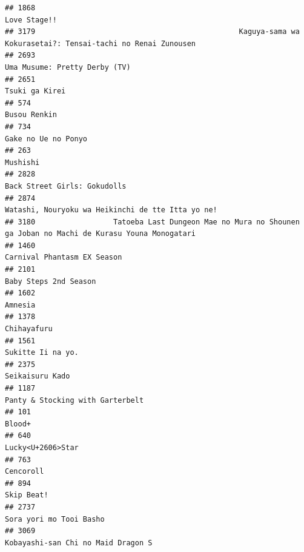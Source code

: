 \documentclass[
]{article}
\begin{document}
\begin{verbatim}
## 1868                                                                                              Love Stage!!
## 3179                                               Kaguya-sama wa Kokurasetai?: Tensai-tachi no Renai Zunousen
## 2693                                                                             Uma Musume: Pretty Derby (TV)
## 2651                                                                                            Tsuki ga Kirei
## 574                                                                                               Busou Renkin
## 734                                                                                        Gake no Ue no Ponyo
## 263                                                                                                   Mushishi
## 2828                                                                              Back Street Girls: Gokudolls
## 2874                                                         Watashi, Nouryoku wa Heikinchi de tte Itta yo ne!
## 3180                  Tatoeba Last Dungeon Mae no Mura no Shounen ga Joban no Machi de Kurasu Youna Monogatari
## 1460                                                                               Carnival Phantasm EX Season
## 2101                                                                                     Baby Steps 2nd Season
## 1602                                                                                                   Amnesia
## 1378                                                                                               Chihayafuru
## 1561                                                                                         Sukitte Ii na yo.
## 2375                                                                                           Seikaisuru Kado
## 1187                                                                          Panty & Stocking with Garterbelt
## 101                                                                                                     Blood+
## 640                                                                                          Lucky<U+2606>Star
## 763                                                                                                  Cencoroll
## 894                                                                                                 Skip Beat!
## 2737                                                                                   Sora yori mo Tooi Basho
## 3069                                                                        Kobayashi-san Chi no Maid Dragon S

\end{verbatim}
\end{document}
